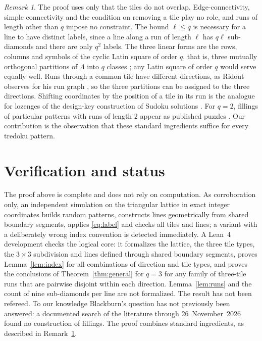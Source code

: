 \documentclass[11pt,a4paper]{amsart}
\theoremstyle{definition}
\theoremstyle{remark}
\newtheorem{remark}[theorem]{Remark}
\begin{document}
\begin{remark}\label{rem:ingredients}
The proof uses only that the tiles do not overlap. Edge-connectivity, simple connectivity and the condition on removing a tile play no role, and runs of length other than $q$ impose no constraint. The bound $\ell\le q$ is necessary for a line to have distinct labels, since a line along a run of length $\ell$ has $q\ell$ sub-diamonds and there are only $q^2$ labels. The three linear forms are the rows, columns and symbols of the cyclic Latin square of order $q$, that is, three mutually orthogonal partitions of $\Lambda$ into $q$ classes \cite{KD}; any Latin square of order $q$ would serve equally well. Runs through a common tile have different directions, as Ridout observes for his run graph \cite{Ridout}, so the three partitions can be assigned to the three directions. Shifting coordinates by the position of a tile in its run is the analogue for lozenges of the design-key construction of Sudoku solutions \cite{PB,BCC}. For $q=2$, fillings of particular patterns with runs of length $2$ appear as published puzzles \cite{Ridout}. Our contribution is the observation that these standard ingredients suffice for every tredoku pattern.
\end{remark}

\section{Verification and status}

The proof above is complete and does not rely on computation. As corroboration only, an independent simulation on the triangular lattice in exact integer coordinates builds random patterns, constructs lines geometrically from shared boundary segments, applies \eqref{eq:label} and checks all tiles and lines; a variant with a deliberately wrong index convention is detected immediately. A Lean~4 development checks the logical core: it formalizes the lattice, the three tile types, the $3\times3$ subdivision and lines defined through shared boundary segments, proves Lemma~\ref{lem:index} for all combinations of direction and tile types, and proves the conclusions of Theorem~\ref{thm:general} for $q=3$ for any family of three-tile runs that are pairwise disjoint within each direction. Lemma~\ref{lem:runs} and the count of nine sub-diamonds per line are not formalized. The result has not been refereed. To our knowledge Blackburn's question has not previously been answered: a documented search of the literature through 26~November~2026 found no construction of fillings. The proof combines standard ingredients, as described in Remark~\ref{rem:ingredients}.
\end{document}
